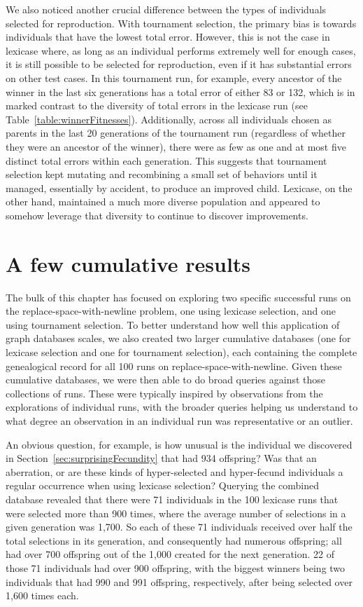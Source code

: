 We also noticed another crucial difference between the types of individuals 
selected for reproduction. With tournament selection, the primary bias is towards individuals that 
have the lowest total error. However, this is not the case in lexicase where, as long as an individual 
performs extremely well for enough cases, it is still possible to be selected for 
reproduction, even if it has substantial errors on other test cases.
In this tournament run, for example, every ancestor of the winner in the
last six generations
has a total error of either 83 or 132, which is in marked contrast to the diversity of total errors
in the lexicase run (see Table~\ref{table:winnerFitnesses}). Additionally, across all individuals chosen
as parents in the last 20 generations of the tournament run (regardless of whether they were an ancestor of the winner), 
there were as few as one and at most five distinct total errors within each generation. 
This suggests that tournament selection kept
mutating and recombining a small set of behaviors until it managed, essentially by accident, to produce an improved 
child. Lexicase, on the other hand, maintained a much more diverse population and appeared to somehow leverage that
diversity to continue to discover improvements.

\section{A few cumulative results}
\label{sec:cumulativeResults}

The bulk of this chapter has focused on exploring two specific successful runs on the replace-space-with-newline problem,
one using lexicase selection, and one using tournament selection. To better understand how well this application of graph
databases scales, we also created two larger cumulative databases (one for lexicase selection and one for tournament selection), each containing the complete genealogical record for all 
100 runs on replace-space-with-newline. Given these cumulative 
databases, we were then able to do broad queries against those collections of runs. These were typically inspired by 
observations from the explorations of individual runs, with the broader queries helping us understand to what degree an 
observation in an individual run was representative or an outlier.

An obvious question, for example, is how unusual is the individual we discovered in Section~\ref{sec:surprisingFecundity} 
that had 934 offspring? Was that an aberration, or are these kinds of hyper-selected and hyper-fecund individuals a
regular occurrence when using lexicase selection? Querying the combined database revealed that there were 71 individuals
in the 100 lexicase runs that were selected more than 900 times, where the average number of selections in a given 
generation was 1,700. So each of these 71 individuals received over half the total selections in its generation, and 
consequently had numerous offspring; all had over 700 offspring out of the 1,000 created for the next generation. 22 of
those 71 individuals had over 900 offspring, with the biggest winners being two individuals that had 990 and 991 
offspring, respectively, after being selected over 1,600 times each. 


